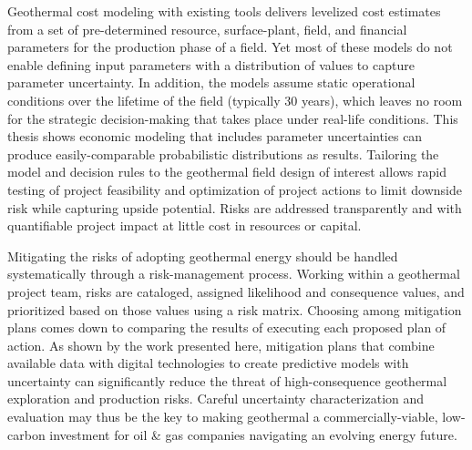 Geothermal cost modeling with existing tools delivers levelized cost estimates from a set of pre-determined resource, surface-plant, field, and financial parameters for the production phase of a field. Yet most of these models do not enable defining input parameters with a distribution of values to capture parameter uncertainty. In addition, the models assume static operational conditions over the lifetime of the field (typically 30 years), which leaves no room for the strategic decision-making that takes place under real-life conditions. This thesis shows economic modeling that includes parameter uncertainties can produce easily-comparable probabilistic distributions as results. Tailoring the model and decision rules to the geothermal field design of interest allows rapid testing of project feasibility and optimization of project actions to limit downside risk while capturing upside potential. Risks are addressed transparently and with quantifiable project impact at little cost in resources or capital.

Mitigating the risks of adopting geothermal energy should be handled systematically through a risk-management process. Working within a geothermal project team, risks are cataloged, assigned likelihood and consequence values, and prioritized based on those values using a risk matrix. Choosing among mitigation plans comes down to comparing the results of executing each proposed plan of action. As shown by the work presented here, mitigation plans that combine available data with digital technologies to create predictive models with uncertainty can significantly reduce the threat of high-consequence geothermal exploration and production risks. Careful uncertainty characterization and evaluation may thus be the key to making geothermal a commercially-viable, low-carbon investment for oil \& gas companies navigating an evolving energy future. 